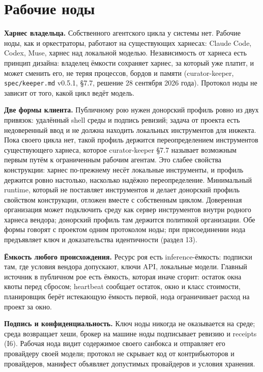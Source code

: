 \documentclass[11pt,a4paper]{article}
\begin{document}
\section{Рабочие ноды}

\textbf{Харнес владельца.} Собственного агентского цикла у системы нет. Рабочие ноды, как и оркестраторы, работают на существующих харнесах: Claude Code, Codex, Muse, харнес над локальной моделью. Независимость от харнеса есть принцип дизайна: владелец ёмкости сохраняет харнес, за который уже платит, и может сменить его, не теряя процессов, бордов и памяти (curator-keeper, \texttt{spec/keeper.md} v0.5.1, §7.7, решение 28 сентября 2026 года). Протокол ноды не зависит от того, какой цикл ведёт модель.

\textbf{Две формы клиента.} Публичному рою нужен донорский профиль ровно из двух привязок: удалённый shell среды и подпись ревизий; задача от проекта есть недоверенный ввод и не должна находить локальных инструментов для инжекта. Пока своего цикла нет, такой профиль держится переопределением инструментов существующего харнеса, которое curator-keeper §7.7 называет возможным первым путём к ограниченным рабочим агентам. Это слабее свойства конструкции: харнес по-прежнему несёт локальные инструменты, и профиль держится ровно настолько, насколько надёжно переопределение. Минимальный runtime, который не поставляет инструментов и делает донорский профиль свойством конструкции, отложен вместе с собственным циклом. Доверенная организация может подключить среду как сервер инструментов внутри родного харнеса вендора; донорский профиль там держится политикой организации. Обе формы говорят с проектом одним протоколом ноды; при присоединении нода предъявляет ключ и доказательства идентичности (раздел 13).

\textbf{Ёмкость любого происхождения.} Ресурс роя есть inference-ёмкость: подписки там, где условия вендора допускают, ключи API, локальные модели. Главный источник в публичном рое есть ёмкость, которая иначе сгорит: остаток окна квоты перед сбросом; heartbeat сообщает остаток, окно и класс стоимости, планировщик берёт истекающую ёмкость первой, нода ограничивает расход на проект за окно.

\textbf{Подпись и конфиденциальность.} Ключ ноды никогда не оказывается на среде; среда возвращает хеши, брокер на машине ноды подписывает ревизию и receipts (I6). Рабочая нода видит содержимое своего санбокса и отправляет его провайдеру своей модели; протокол не скрывает код от контрибьюторов и провайдеров, манифест объявляет допустимых провайдеров и условия хранения.
\end{document}
